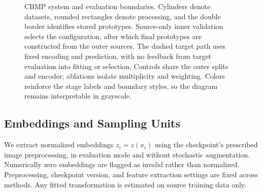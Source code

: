\begin{figure}[t]
\caption{CBMP system and evaluation boundaries. Cylinders denote datasets, rounded rectangles denote processing, and the double border identifies stored prototypes. Source-only inner validation selects the configuration, after which final prototypes are constructed from the outer sources. The dashed target path uses fixed encoding and prediction, with no feedback from target evaluation into fitting or selection. Controls share the outer splits and encoder; ablations isolate multiplicity and weighting. Colors reinforce the stage labels and boundary styles, so the diagram remains interpretable in grayscale.}
\label{fig:cbmp_system}
\end{figure}

\subsection{Embeddings and Sampling Units}
We extract normalized embeddings $z_i=z(x_i)$ using the checkpoint's prescribed image preprocessing, in evaluation mode and without stochastic augmentation. Numerically zero embeddings are flagged as invalid rather than normalized. Preprocessing, checkpoint version, and feature extraction settings are fixed across methods. Any fitted transformation is estimated on source training data only.

